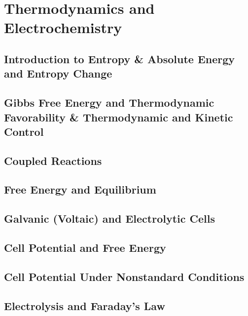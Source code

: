 \documentclass[../chem.tex]{subfiles}
\begin{document}
\chapter{Thermodynamics and Electrochemistry}
\section{Introduction to Entropy \& Absolute Energy and Entropy Change}
\section{Gibbs Free Energy and Thermodynamic Favorability \& Thermodynamic and Kinetic Control}
\section{Coupled Reactions}
\section{Free Energy and Equilibrium}
\section{Galvanic (Voltaic) and Electrolytic Cells}
\section{Cell Potential and Free Energy}
\section{Cell Potential Under Nonstandard Conditions}
\section{Electrolysis and Faraday's Law}
\end{document}
